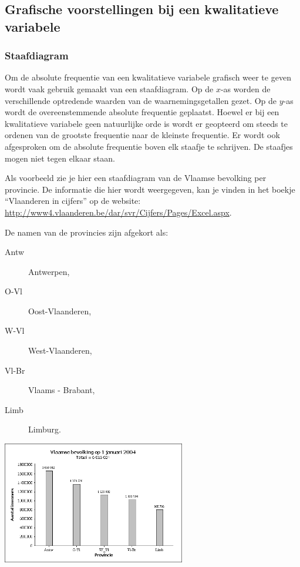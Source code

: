 \documentclass[12pt,twoside]{article}
\begin{document}
\pagebreak
\subsection{Grafische voorstellingen bij een kwalitatieve variabele}

\subsubsection{Staafdiagram}

Om de absolute frequentie van een kwalitatieve variabele grafisch weer te geven wordt vaak gebruik gemaakt van een staafdiagram. Op de $x$-as worden de verschillende optredende waarden van de waarnemingsgetallen gezet. Op de $y$-as wordt de overeenstemmende absolute frequentie geplaatst. Hoewel er bij een kwalitatieve variabele geen natuurlijke orde is wordt er geopteerd om steeds te ordenen van de grootste frequentie naar de kleinste frequentie. Er wordt ook afgesproken om de absolute frequentie boven elk staafje te schrijven. De staafjes mogen niet tegen elkaar staan.

Als voorbeeld zie je hier een staafdiagram
van de Vlaamse bevolking per provincie. De
informatie die hier wordt weergegeven, kan
je vinden in het boekje “Vlaanderen in
cijfers” op de website:
\url{http://www4.vlaanderen.be/dar/svr/Cijfers/Pages/Excel.aspx}.


\begin{minipage}{0.5\textwidth}
De namen van de provincies zijn afgekort als:
  \begin{description}
    \item[Antw] Antwerpen,
    \item[O-Vl] Oost-Vlaanderen,
    \item[W-Vl] West-Vlaanderen,
    \item[Vl-Br] Vlaams - Brabant,
    \item[Limb] Limburg.
  \end{description}
\end{minipage}
\begin{minipage}{0.5\textwidth}
%  
  \includegraphics[width=8cm]{vlaamse_bevolking.png}
\end{minipage}
\end{document}
